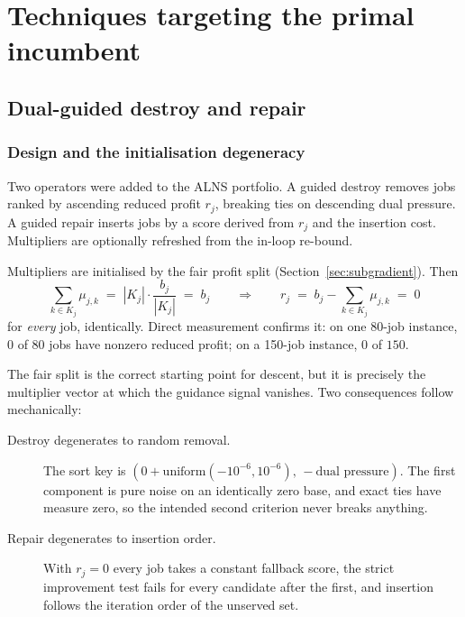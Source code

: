 \documentclass[11pt,a4paper]{article}
\newcommand{\Kj}{\ensuremath{K_j}}
\begin{document}
\section{Techniques targeting the primal incumbent}\label{sec:primal}

\subsection{Dual-guided destroy and repair}\label{sec:guided}

\subsubsection{Design and the initialisation degeneracy}\label{sec:degeneracy}

Two operators were added to the ALNS portfolio. A guided destroy removes jobs
ranked by ascending reduced profit $r_j$, breaking ties on descending dual
pressure. A guided repair inserts jobs by a score derived from $r_j$ and the
insertion cost. Multipliers are optionally refreshed from the in-loop re-bound.

Multipliers are initialised by the fair profit split
(Section~\ref{sec:subgradient}). Then
\[
\sum_{k\in \Kj}\mu_{j,k}\;=\;|\Kj|\cdot\frac{b_j}{|\Kj|}\;=\;b_j
\qquad\Longrightarrow\qquad
r_j \;=\; b_j-\sum_{k\in \Kj}\mu_{j,k} \;=\; 0
\]
for \emph{every} job, identically. Direct measurement confirms it: on one 80-job
instance, $0$ of $80$ jobs have nonzero reduced profit; on a 150-job instance, $0$
of $150$.

The fair split is the correct starting point for descent, but it is precisely the
multiplier vector at which the guidance signal vanishes. Two consequences follow
mechanically:

\begin{description}
  \item[Destroy degenerates to random removal.] The sort key is
    $(0+\text{uniform}(-10^{-6},10^{-6}),\,-\text{dual pressure})$. The first
    component is pure noise on an identically zero base, and exact ties have
    measure zero, so the intended second criterion never breaks anything.
  \item[Repair degenerates to insertion order.] With $r_j=0$ every job takes a
    constant fallback score, the strict improvement test fails for every candidate
    after the first, and insertion follows the iteration order of the unserved
    set.
\end{description}
\end{document}
